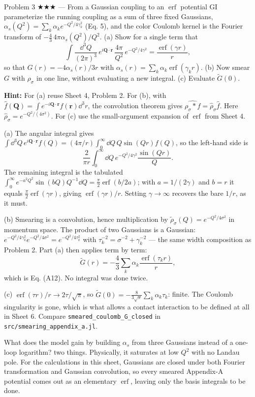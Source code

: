 \documentclass[11pt]{article}
\begin{document}
\begin{problem}{Problem 3 ★★★ — From a Gaussian coupling to an $\operatorname{erf}$ potential}
GI parameterize the running coupling as a sum of three fixed Gaussians,
$\alpha_s(Q^2)=\sum_k\alpha_k e^{-Q^2/4\gamma_k^2}$ (Eq. 5), and the color
Coulomb kernel is the Fourier transform of $-\tfrac43\,4\pi\alpha_s(Q^2)/Q^2$.
(a) Show for a single term that
\[
\int\frac{\dd^3Q}{(2\pi)^3}\,e^{i\bm Q\cdot\bm r}\,\frac{4\pi}{Q^2}\,
e^{-Q^2/4\gamma^2}=\frac{\operatorname{erf}(\gamma r)}{r},
\]
so that $G(r)=-4\alpha_s(r)/3r$ with
$\alpha_s(r)=\sum_k\alpha_k\operatorname{erf}(\gamma_kr)$.
(b) Now smear $G$ with $\rho_\sigma$ in one line, without evaluating a new
integral.
(c) Evaluate $\widetilde G(0)$.

\textbf{Hint:} For (a) reuse Sheet 4, Problem 2. For (b), with
$\widehat f(\bm Q)=\int e^{-i\bm Q\cdot\bm r}f(\bm r)\dd^3r$,
the convolution theorem gives $\widehat{\rho_\sigma*f}=\widehat\rho_\sigma\widehat f$.
Here $\widehat\rho_\sigma=e^{-Q^2/(4\sigma^2)}$.
For (c) use the small-argument expansion of $\operatorname{erf}$ from Sheet 4.
\end{problem}
\begin{solution}
(a) The angular integral gives
$\int\dd^3Q\,e^{i\bm Q\cdot\bm r}f(Q)=(4\pi/r)\int_0^\infty\dd Q\,Q\sin(Qr)f(Q)$,
so the left-hand side is
\[
\frac{2}{\pi r}\int_0^\infty \dd Q\,e^{-Q^2/4\gamma^2}\frac{\sin(Qr)}{Q}.
\]
The remaining integral is the tabulated
$\int_0^\infty e^{-a^2Q^2}\sin(bQ)Q^{-1}\dd Q=\tfrac\pi2\operatorname{erf}(b/2a)$;
with $a=1/(2\gamma)$ and $b=r$ it equals $\tfrac\pi2\operatorname{erf}(\gamma r)$,
giving $\operatorname{erf}(\gamma r)/r$. Setting $\gamma\to\infty$ recovers the
bare $1/r$, as it must.

(b) Smearing is a convolution, hence multiplication by
$\widetilde\rho_\sigma(Q)=e^{-Q^2/4\sigma^2}$ in momentum space. The product of
two Gaussians is a Gaussian:
$e^{-Q^2/4\gamma_k^2}e^{-Q^2/4\sigma^2}=e^{-Q^2/4\tau_k^2}$ with
$\tau_k^{-2}=\sigma^{-2}+\gamma_k^{-2}$ --- the same width composition as
Problem 2. Part (a) then applies term by term:
\[
\widetilde G(r)=-\frac43\sum_k\alpha_k\frac{\operatorname{erf}(\tau_kr)}{r},
\]
which is Eq. (A12). No integral was done twice.

(c) $\operatorname{erf}(\tau r)/r\to2\tau/\sqrt\pi$, so
$\widetilde G(0)=-\tfrac{8}{3\sqrt\pi}\sum_k\alpha_k\tau_k$: finite. The
Coulomb singularity is gone, which is what allows a contact interaction to be
defined at all in Sheet 6. Compare
\texttt{smeared\_coulomb\_G\_closed} in
\texttt{src/smearing\_appendix\_a.jl}.
\end{solution}
\begin{quiz}
What does the model gain by building $\alpha_s$ from three Gaussians instead of
a one-loop logarithm? \answer two things. Physically, it saturates at low $Q^2$
with no Landau pole. For the calculations in this sheet,
Gaussians are closed under both Fourier transformation and Gaussian
convolution, so every smeared Appendix-A potential comes out as an elementary
$\operatorname{erf}$, leaving only the basis integrals to be done.
\end{quiz}
\end{document}
